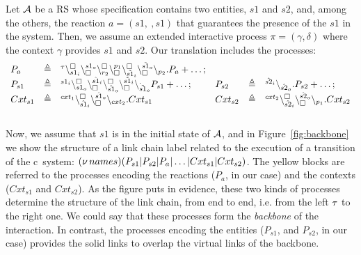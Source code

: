  
 \begin{example}\label{ex:backbone}
 Let ${\cal A}$ be a RS whose specification contains two entities, $s1$ and $s2$, and, among the others, the reaction $a=(s1,\ , s1)$ that guarantees the presence of the  $s1$ in the system. Then, we assume an  extended interactive process $\pi=(\gamma,\delta)$ where the context $\gamma$ provides  $s1$ and $s2$.
 Our translation includes the processes:\\
 \[
 \begin{array}{lcllcl}
 P_a &\triangleq& {}^{\tau}\backslash_{s1_i}^{\scriptstyle {\square}}\backslash_{\scriptstyle {\square}}^{s1_o}\backslash_{r_2}^{\scriptstyle {\square}} \backslash_{\scriptstyle {\square}}^{p_1}\backslash_{\tilde{s1}_i}^{\scriptstyle {\square}}\backslash_{\scriptstyle {\square}}^{\tilde{s1}_o}\backslash_{p_2}.P_a + \dots; \\
 P_{s1} &\triangleq& {}^{s1_i}\backslash_{s1_o}^{\scriptstyle {\square}}\backslash_{\scriptstyle {\square}}^{\hat{s1}_i}\backslash_{\hat{s1}_o}^{\scriptstyle {\square}}\backslash_{\scriptstyle {\square}}^{\tilde{s1}_i}\backslash_{\tilde{s1}_o}^{.}P_{s1} + \dots; &
  P_{s2} &\triangleq& {}^{\hat{s2}_i} \backslash_{\hat{s2}_o}.P_{s2} + \dots;\\
 Cxt_{s1}& \triangleq & {}^{cxt_1}\backslash_{\hat{s1}_i}^{\scriptstyle {\square}}\backslash_{\scriptstyle {\square}}^{\hat{s1}_o}\backslash_{cxt_2}.Cxt_{s1} &
  Cxt _{s2} &\triangleq& {}^{cxt_2}\backslash_{\hat{s2}_i}^{\scriptstyle {\square}}\backslash_{\scriptstyle {\square}}^{\hat{s2}_o}\backslash_{p_1}. Cxt_{s2}
\end{array}
\]  \\
   Now, we assume that $s1$ is in the initial state of ${\cal A}$, and in Figure~\ref{fig:backbone} we show the  structure of a link chain label related to the execution of a transition of the c\CNA \ system: $(\nu\, names) (P_{s1}|P_{s2}| P_a|\dots|Cxt_{s1}|Cxt_{s2})$. The yellow blocks are referred to the processes encoding the reactions ($P_a$, in our case) and the contexts ($Cxt_{s1}$ and $Cxt_{s2}$). As the figure puts in evidence, these two kinds of processes determine the structure of the link chain, from end to end, i.e. from the left $\tau$ to the right one. We could say that these processes form the \emph{backbone} of the interaction.
   In contrast, the processes encoding the entities ($P_{s1}$, and $P_{s2}$, in our case) provides the
    solid links to overlap the virtual links   of the backbone.
 
  \begin{figure}[t]
\end{figure}
\end{example}

